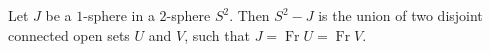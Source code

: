 Let $J$ be a $1$-sphere in a $2$-sphere $S^2$. Then $S^2 - J$ is the union of two disjoint connected open sets $U$ and $V$, such that $J = \operatorname{Fr} U = \operatorname{Fr} V$.
